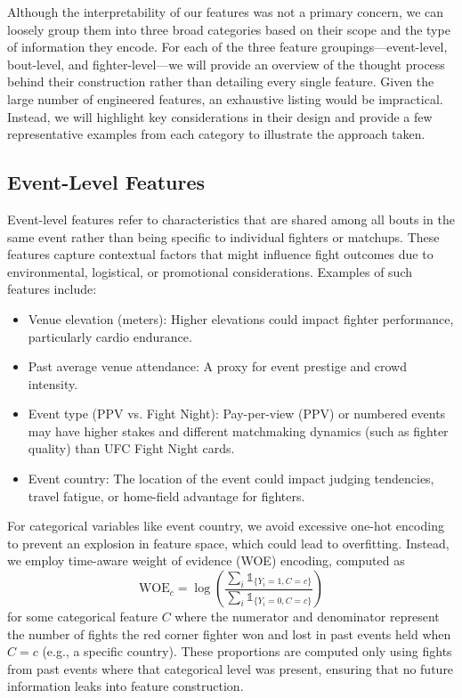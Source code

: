 \documentclass[12pt,twoside]{report}
\begin{document}
Although the interpretability of our features was not a primary concern, we can loosely group them into three broad categories based on their scope and the type of information they encode. For each of the three feature groupings---event-level, bout-level, and fighter-level---we will provide an overview of the thought process behind their construction rather than detailing every single feature. Given the large number of engineered features, an exhaustive listing would be impractical. Instead, we will highlight key considerations in their design and provide a few representative examples from each category to illustrate the approach taken.

\subsection{Event-Level Features}

Event-level features refer to characteristics that are shared among all bouts in the same event rather than being specific to individual fighters or matchups. These features capture contextual factors that might influence fight outcomes due to environmental, logistical, or promotional considerations. Examples of such features include:
\begin{itemize}
    \item Venue elevation (meters): Higher elevations could impact fighter performance, particularly cardio endurance.

    \item Past average venue attendance: A proxy for event prestige and crowd intensity.

    \item Event type (PPV vs. Fight Night): Pay-per-view (PPV) or numbered events may have higher stakes and different matchmaking dynamics (such as fighter quality) than UFC Fight Night cards.

    \item Event country: The location of the event could impact judging tendencies, travel fatigue, or home-field advantage for fighters.
\end{itemize}
For categorical variables like event country, we avoid excessive one-hot encoding to prevent an explosion in feature space, which could lead to overfitting. Instead, we employ time-aware weight of evidence (WOE) encoding, computed as
$$\text{WOE}_c = \log\left( \frac{\sum_{i} \mathds{1}_{\{ Y_i = 1, C = c \}}}{\sum_{i} \mathds{1}_{\{ Y_i = 0, C = c \}}} \right)$$
for some categorical feature $C$ where the numerator and denominator represent the number of fights the red corner fighter won and lost in past events held when $C = c$ (e.g., a specific country). These proportions are computed only using fights from past events where that categorical level was present, ensuring that no future information leaks into feature construction. 
\end{document}
